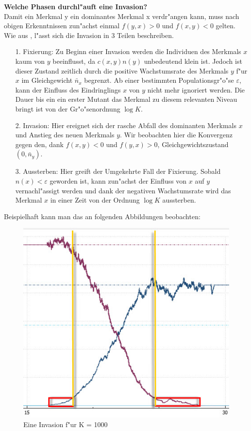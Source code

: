 \documentclass[11pt, a4paper, german]{article}
\theoremstyle{plain}
\newcommand{\eps}{\ensuremath{\varepsilon}}
\begin{document}
	\textbf{Welche Phasen durchl"auft eine Invasion?}\\
	Damit ein Merkmal y ein dominantes Merkmal x verdr"angen kann, muss nach obigen Erkenntnissen zun"achst einmal $ f(y,x) > 0 $ und $ f(x,y) < 0 $ gelten.\\
	Wie aus \cite{Silke}, l"asst sich die Invasion in 3 Teilen beschreiben. 
	\begin{itemize}
		\item [1.] Fixierung: Zu Beginn einer Invasion werden die Individuen des Merkmals $ x $ kaum von $ y $ beeinflusst, da $ c(x,y)n(y) $ unbedeutend klein ist. Jedoch ist dieser Zustand zeitlich durch die positive Wachstumsrate des Merkmals $ y $ f"ur $ x $ im Gleichgewicht $ \bar{n}_x $ begrenzt. Ab einer bestimmten Populationsgr"o"se $ \eps $, kann der Einfluss des Eindringlings $ x $ von $ y $ nicht mehr ignoriert werden. Die Dauer bis ein ein erster Mutant das Merkmal zu diesem relevanten Niveau bringt ist von der Gr"o"senordnung $ \log K $.
		\item [2.] Invasion: Hier ereignet sich der rasche Abfall des dominanten Merkmals $ x $ und Anstieg des neuen Merkmals $ y $. Wir beobachten hier die Konvergenz gegen den, dank $ f(x,y) < 0 $ und $ f(y,x) > 0 $, Gleichgewichtszustand $ (0,\bar{n}_y) $.
		\item [3.] Aussterben: Hier greift der Umgekehrte Fall der Fixierung. Sobald $ n(x) < \eps $ geworden ist, kann zun"achst der Einfluss von $ x $ auf $ y $ vernachl"assigt werden und dank der negativen Wachstumsrate wird das Merkmal $ x $ in einer Zeit von der Ordnung $ \log K $ aussterben.
	\end{itemize}
	Beispielhaft kann man das an folgenden Abbildungen beobachten:\\
	\begin{minipage}{0.7 \textwidth}
	\begin{figure}[H]
		\centering
		\includegraphics[width=1 \linewidth]{./Pictures/Invasion2}
		\caption[Invasion]{Eine Invasion f"ur K = 1000}
		\label{Invasionsphasen}
	\end{figure}
	\end{minipage}
\end{document}
